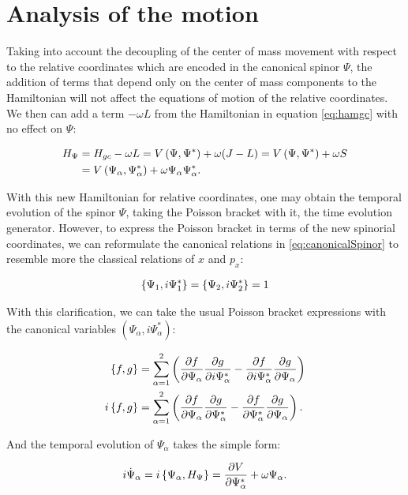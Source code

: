 \section{Analysis of the motion}
Taking into account the decoupling of the center of mass movement with respect to the relative coordinates which are encoded in the canonical spinor $\Psi$, the addition of terms that depend only on the center of mass components to the Hamiltonian will not affect the equations of motion of the relative coordinates. We then can add a term $-\omega L$ from the Hamiltonian in equation \eqref{eq:hamgc} with no effect on $\Psi$:

\begin{align*}
H_{\Psi} &= H_{gc} - \omega L =  V\left( \Psi,\Psi^* \right)+ \omega (J-L) = V\left( \Psi,\Psi^* \right)+ \omega S\\
&= V\left( \Psi_\alpha,\Psi_\alpha^* \right)+ \omega\Psi_\alpha\Psi^*_\alpha.
\end{align*}

With this new Hamiltonian for relative coordinates, one may obtain the temporal evolution of the spinor $\Psi$, taking the Poisson bracket with it, the time evolution generator. However, to express the Poisson bracket in terms of the new spinorial coordinates, we can reformulate the canonical relations in \eqref{eq:canonicalSpinor} to resemble more the classical relations of $x$ and $p_x$:

\begin{align*}
\left\lbrace \Psi_1, i\Psi^*_1 \right\rbrace = \left\lbrace \Psi_2, i\Psi^*_2 \right\rbrace = 1
\end{align*}

With this clarification, we can take the usual Poisson bracket expressions with the canonical variables $(\Psi_\alpha,i\Psi^*_\alpha)$:

\begin{align*}
\left\lbrace f, g \right\rbrace &= \sum_{\alpha = 1}^2 \left( \frac{\partial f}{\partial \Psi_\alpha }\frac{\partial g}{\partial i\Psi_\alpha^*}-\frac{\partial f}{\partial i\Psi_\alpha^* }\frac{\partial g}{\partial \Psi_\alpha} \right) \\
i\left\lbrace f, g \right\rbrace &= \sum_{\alpha = 1}^2 \left( \frac{\partial f}{\partial \Psi_\alpha }\frac{\partial g}{\partial \Psi_\alpha^*}-\frac{\partial f}{\partial \Psi_\alpha^* }\frac{\partial g}{\partial \Psi_\alpha} \right) .
\end{align*}

And the temporal evolution of $\Psi_\alpha$ takes the simple form:

\begin{align*}
i\dot{\Psi}_\alpha = i\left\lbrace \Psi_\alpha, H_{\Psi} \right\rbrace = \frac{\partial V}{\partial \Psi_\alpha^*} + \omega \Psi_\alpha.
\end{align*}

